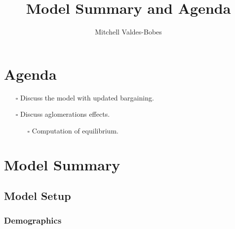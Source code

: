 \documentclass[
  letterpaper,
  DIV=11,
  numbers=noendperiod]{scrartcl}
\title{Model Summary and Agenda}
\author{Mitchell Valdes-Bobes}
\date{}
\providecommand{\tightlist}{%
  \setlength{\itemsep}{0pt}\setlength{\parskip}{0pt}}\usepackage{longtable,booktabs,array}
\begin{document}
\maketitle
\ifdefined\Shaded\renewenvironment{Shaded}{\begin{tcolorbox}[interior hidden, borderline west={3pt}{0pt}{shadecolor}, breakable, enhanced, sharp corners, boxrule=0pt, frame hidden]}{\end{tcolorbox}}\fi

\hypertarget{agenda}{%
\section{Agenda}\label{agenda}}

\begin{itemize}
\tightlist
\item[$\square$]
  Discuss the model with updated bargaining.
\item[$\square$]
  Discuss aglomerations effects.

  \begin{itemize}
  \tightlist
  \item[$\square$]
    Computation of equilibrium.
  \end{itemize}
\end{itemize}

\hypertarget{model-summary}{%
\section{Model Summary}\label{model-summary}}

\hypertarget{model-setup}{%
\subsection{Model Setup}\label{model-setup}}

\hypertarget{demographics}{%
\subsubsection{Demographics}\label{demographics}}
\end{document}

